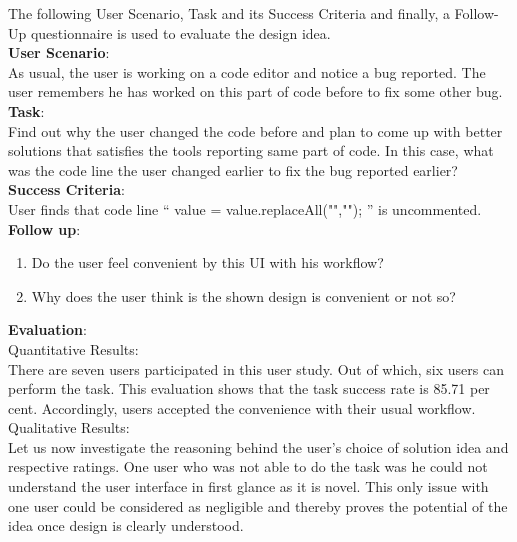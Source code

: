 The following User Scenario, Task and its Success Criteria and finally, a Follow-Up questionnaire is used to evaluate the design idea. \\

\textbf{User Scenario}: \\

As usual, the user is working on a code editor and notice a bug reported. The user remembers he has worked on this part of code before to fix some other bug. \\
 
\textbf{Task}: \\

Find out why the user changed the code before and plan to come up with better solutions that satisfies the tools reporting same part of code. In this case, what was the code line the user changed earlier to fix the bug reported earlier? \\

\textbf{Success Criteria}: \\

User finds that code line “ value = value.replaceAll("",""); ” is uncommented. \\

\clearpage
\textbf{Follow up}: \\

\begin{enumerate}
\item Do the user feel convenient by this UI with his workflow?
\item Why does the user think is the shown design is convenient or not so?
\end{enumerate}

\textbf{Evaluation}: \\

Quantitative Results: \\

There are seven users participated in this user study. Out of which, six users can perform the task. This evaluation shows that the task success rate is 85.71 per cent. Accordingly, users accepted the convenience with their usual workflow. \\

Qualitative Results: \\

Let us now investigate the reasoning behind the user’s choice of solution idea and respective ratings.  One user who was not able to do the task was he could not understand the user interface in first glance as it is novel. This only issue with one user could be considered as negligible and thereby proves the potential of the idea once design is clearly understood. \\

